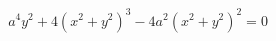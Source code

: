 \documentclass[preview]{standalone}
\begin{document}
\begin{align*}
a^4 y^2 + 4(x^2 + y^2)^3 - 4a^2(x^2 + y^2)^2 = 0
\end{align*}
\end{document}
